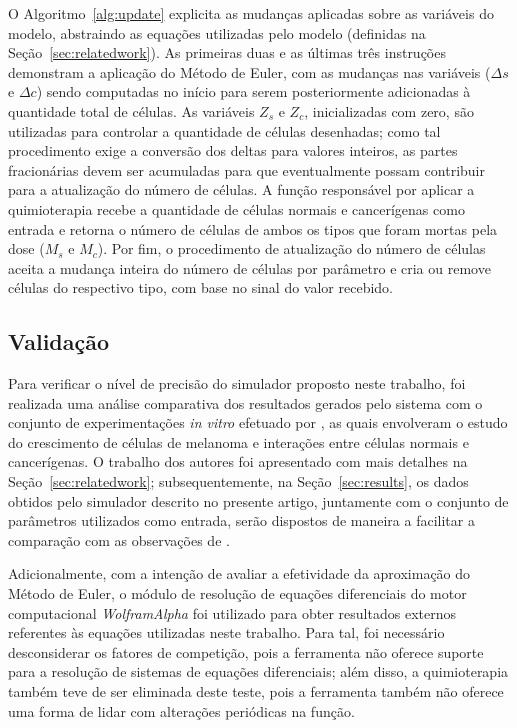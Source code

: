 \documentclass[12pt]{article}
\begin{document}
O Algoritmo~\ref{alg:update} explicita as mudanças aplicadas sobre as variáveis do modelo, abstraindo as equações utilizadas pelo modelo (definidas na Seção~\ref{sec:relatedwork}). As primeiras duas e as últimas três instruções demonstram a aplicação do Método de Euler, com as mudanças nas variáveis ($\Delta s$ e $\Delta c$) sendo computadas no início para serem posteriormente adicionadas à quantidade total de células. As variáveis $Z_s$ e $Z_c$, inicializadas com zero, são utilizadas para controlar a quantidade de células desenhadas; como tal procedimento exige a conversão dos deltas para valores inteiros, as partes fracionárias devem ser acumuladas para que eventualmente possam contribuir para a atualização do número de células. A função responsável por aplicar a quimioterapia recebe a quantidade de células normais e cancerígenas como entrada e retorna o número de células de ambos os tipos que foram mortas pela dose ($M_s$ e $M_c$). Por fim, o procedimento de atualização do número de células aceita a mudança inteira do número de células por parâmetro e cria ou remove células do respectivo tipo, com base no sinal do valor recebido.

\subsection{Validação}

Para verificar o nível de precisão do simulador proposto neste trabalho, foi realizada uma análise comparativa dos resultados gerados pelo sistema com o conjunto de experimentações \textit{in vitro} efetuado por \cite{Cornil1991}, as quais envolveram o estudo do crescimento de células de melanoma e interações entre células normais e cancerígenas. O trabalho dos autores foi apresentado com mais detalhes na Seção~\ref{sec:relatedwork}; subsequentemente, na Seção~\ref{sec:results}, os dados obtidos pelo simulador descrito no presente artigo, juntamente com o conjunto de parâmetros utilizados como entrada, serão dispostos de maneira a facilitar a comparação com as observações de \cite{Cornil1991}.

Adicionalmente, com a intenção de avaliar a efetividade da aproximação do Método de Euler, o módulo de resolução de equações diferenciais do motor computacional \emph{WolframAlpha} foi utilizado para obter resultados externos referentes às equações utilizadas neste trabalho. Para tal, foi necessário desconsiderar os fatores de competição, pois a ferramenta não oferece suporte para a resolução de sistemas de equações diferenciais; além disso, a quimioterapia também teve de ser eliminada deste teste, pois a ferramenta também não oferece uma forma de lidar com alterações periódicas na função.
\end{document}
